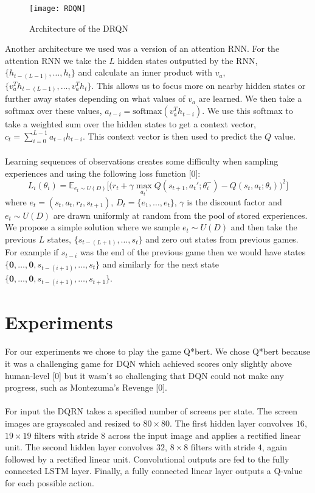 \documentclass{article}
\begin{document}
\begin{figure}[h]
    \centering
    \texttt{[image: RDQN]}
    \caption{Architecture of the DRQN}
\end{figure}

Another architecture we used was a version of an attention RNN. For the attention
RNN we take the $L$ hidden states outputted by the RNN, $\{h_{t-(L-1)}, \dots, h_{t}\}$
and calculate an inner product with $v_a$, $\{v_a^Th_{t-(L-1)}, \dots, v_a^Th_{t}\}$.
This allows us to focus more on nearby hidden states or further away states depending
on what values of $v_a$ are learned. We then take a softmax over these values,
$a_{t-i} = \text{softmax}(v_a^Th_{t-i})$. We use this softmax to take a weighted
sum over the hidden states to get a context vector, $c_t =
\sum_{i=0}^{L-1}a_{t-i}h_{t-i}$. This context vector is then used to predict the
$Q$ value. \\
\\
Learning sequences of observations creates some difficulty when sampling experiences
and using the following loss function [0]:
$$L_i(\theta_i) = \mathbb{E}_{e_t \sim U(D)}
\Big[\Big(
r_t + \gamma \max_{a_t'}Q(s_{t+1}, a_t'; \theta_i^-) -Q(s_t, a_t; \theta_i)
\Big)^2 \Big]$$
where $e_t = (s_t, a_t, r_t, s_{t+1})$, $D_t = \{e_1, \dots, e_t\}$, $\gamma$
is the discount factor and $e_t \sim U(D)$ are drawn uniformly at random from the
pool of stored experiences. We propose a simple solution where we sample $e_t
\sim U(D)$ and then take the previous $L$ states, $\{s_{t-(L+1)}, \dots, s_t\}$
and zero out states from previous games. For example if $s_{t-i}$ was the end of
the previous game then we would have states $\{\mathbf{0}, \dots, \mathbf{0},
s_{t-(i+1)}, \dots, s_t\}$ and similarly for the next state $\{\mathbf{0}, \dots,
\mathbf{0},s_{t-(i+1)}, \dots, s_{t+1}\}$.


\section{Experiments}
For our experiments we chose to play the game Q*bert. We chose Q*bert because it
was a challenging game for DQN which achieved scores only slightly above human-level
[0] but it wasn't so challenging that DQN could not make any progress, such as
Montezuma's Revenge [0]. \\
\\
For input the DQRN takes a specified number of screens per state. The screen images
are grayscaled and resized to $80 \times 80$. The first hidden layer convolves $16$,
$19 \times 19$ filters with stride 8 across the input image and applies a rectified
linear unit.  The second hidden layer convolves $32$, $8 \times 8$ filters with
stride $4$, again followed by a rectified linear unit.  Convolutional outputs are
fed to the fully connected LSTM layer.  Finally, a fully connected linear layer
outputs a Q-value for each possible action. \\
\\
\end{document}
